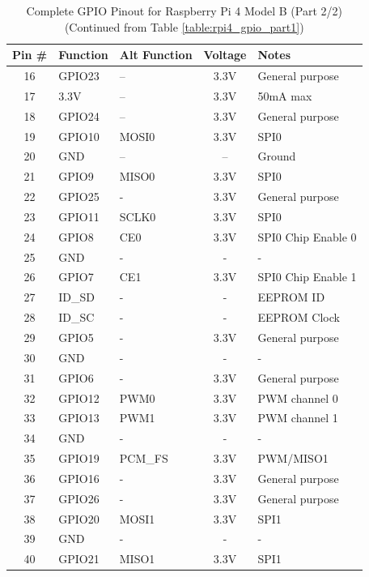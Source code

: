 \begin{table}[h!]
	\centering
	\caption{Complete GPIO Pinout for Raspberry Pi 4 Model B (Part 2/2) (Continued from Table \ref{table:rpi4_gpio_part1})}
	\label{table:rpi4_gpio_part2}
	\begin{tabular}{|c|l|l|c|l|}
		\hline
		\textbf{Pin \#} & \textbf{Function} & \textbf{Alt Function} & \textbf{Voltage} & \textbf{Notes} \\ \hline
		16 & GPIO23 & -- & 3.3V & General purpose \\ \hline
		17 & 3.3V & -- & 3.3V & 50mA max \\ \hline
		18 & GPIO24 & -- & 3.3V & General purpose \\ \hline
		19 & GPIO10 & MOSI0 & 3.3V & SPI0 \\ \hline
		20 & GND & -- & -- & Ground \\ \hline
		21 & GPIO9 & MISO0 & 3.3V & SPI0 \\ \hline
		22 & GPIO25 & - & 3.3V & General purpose \\ \hline
		23 & GPIO11 & SCLK0 & 3.3V & SPI0 \\ \hline
		24 & GPIO8 & CE0 & 3.3V & SPI0 Chip Enable 0 \\ \hline
		25 & GND & - & - & - \\ \hline
		26 & GPIO7 & CE1 & 3.3V & SPI0 Chip Enable 1 \\ \hline
		27 & ID\_SD & - & - & EEPROM ID \\ \hline
		28 & ID\_SC & - & - & EEPROM Clock \\ \hline
		29 & GPIO5 & - & 3.3V & General purpose \\ \hline
		30 & GND & - & - & - \\ \hline
		31 & GPIO6 & - & 3.3V & General purpose \\ \hline
		32 & GPIO12 & PWM0 & 3.3V & PWM channel 0 \\ \hline
		33 & GPIO13 & PWM1 & 3.3V & PWM channel 1 \\ \hline
		34 & GND & - & - & - \\ \hline
		35 & GPIO19 & PCM\_FS & 3.3V & PWM/MISO1 \\ \hline
		36 & GPIO16 & - & 3.3V & General purpose \\ \hline
		37 & GPIO26 & - & 3.3V & General purpose \\ \hline
		38 & GPIO20 & MOSI1 & 3.3V & SPI1 \\ \hline
		39 & GND & - & - & - \\ \hline
		40 & GPIO21 & MISO1 & 3.3V & SPI1 \\ \hline
\end{tabular}
\end{table}



